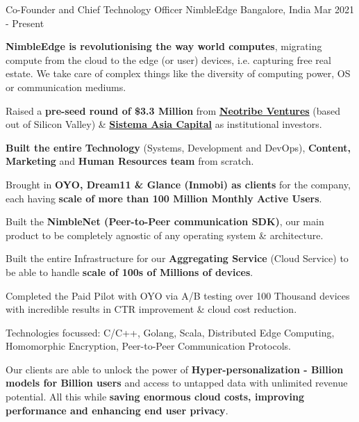 \begin{cventries}
  \cventry
    {Co-Founder and Chief Technology Officer} %
    {NimbleEdge} %
    {Bangalore, India} %
    {Mar 2021 - Present} %
    {
      \begin{cvitems} %
      \item {\textbf{NimbleEdge is revolutionising the way world computes}, migrating compute from the cloud to the edge (or user) devices, i.e. capturing free real estate. We take care of complex things like the diversity of computing power, OS or communication mediums.}
        \item {Raised a \textbf{pre-seed round of \$3.3 Million} from \href{http://www.neotribe.vc/}{\textbf{Neotribe Ventures}} (based out of Silicon Valley) \& \href{https://sistemaasiacapital.com/}{\textbf{Sistema Asia Capital}} as institutional investors.}
        \item {\textbf{Built the entire Technology} (Systems, Development and DevOps), \textbf{Content, Marketing} and \textbf{Human Resources team} from scratch.}
        \item {Brought in \textbf{OYO, Dream11 \& Glance (Inmobi) as clients} for the company, each having \textbf{scale of more than 100 Million Monthly Active Users}.}
        \item {Built the \textbf{NimbleNet (Peer-to-Peer communication SDK)}, our main product to be completely agnostic of any operating system \& architecture.}
        \item {Built the entire Infrastructure for our \textbf{Aggregating Service} (Cloud Service) to be able to handle \textbf{scale of 100s of Millions of devices}.}
        \item {Completed the Paid Pilot with OYO via A/B testing over 100 Thousand devices with incredible results in CTR improvement \& cloud cost reduction.}
        \item {Technologies focussed: C/C++, Golang, Scala, Distributed Edge Computing, Homomorphic Encryption, Peer-to-Peer Communication Protocols.}
        \item {Our clients are able to unlock the power of \textbf{Hyper-personalization - Billion models for Billion users} and access to untapped data with unlimited revenue potential. All this while \textbf{saving enormous cloud costs, improving performance and enhancing end user privacy}.}
      \end{cvitems}
    }


\end{cventries}
